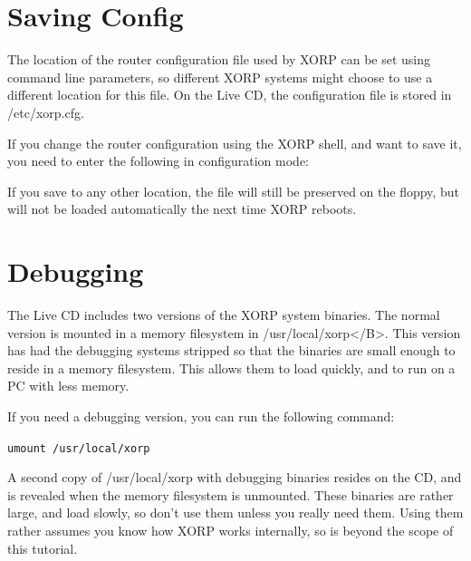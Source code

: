 \section{Saving Config}

The location of the router configuration file used by XORP can be set
using command line parameters, so different XORP systems might choose
to use a different location for this file.  On the Live CD, the
configuration file is stored in {\stt /etc/xorp.cfg}.

If you change the router configuration using the XORP shell, and want
to save it, you need to enter the following in configuration mode:

\vspace{0.1in}
\noindent{}
\vspace{0.1in}

If you save to any other location, the file will still be preserved on
the floppy, but will not be loaded automatically the next time XORP reboots.

\section{Debugging}

The Live CD includes two versions of the XORP system binaries.  The
normal version is mounted in a memory filesystem in
{\stt /usr/local/xorp</B>}.  This version has had the debugging systems
stripped so that the binaries are small enough to reside in a memory
filesystem.  This allows them to load quickly, and to run on a PC with
less memory.

If you need a debugging version, you can run the following command:

{\tt umount /usr/local/xorp}

A second copy of {\stt /usr/local/xorp} with debugging
binaries resides on the CD, and is revealed when the memory filesystem
is unmounted.  These binaries are rather large, and load slowly, so
don't use them unless you really need them.  Using them rather assumes
you know how XORP works internally, so is beyond the scope of this
tutorial.

